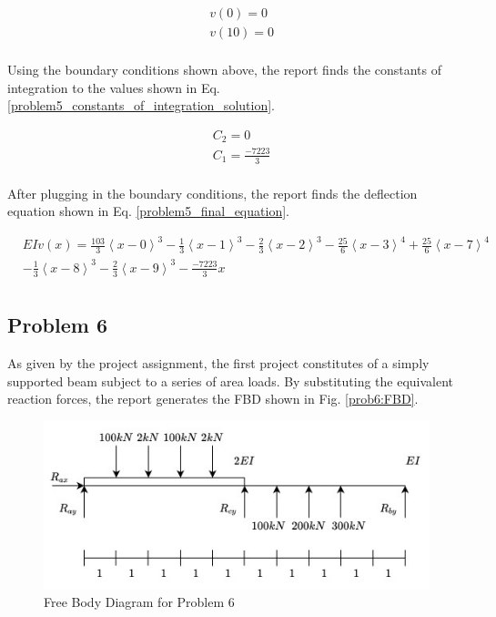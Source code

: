 \documentclass[a4paper]{article}
\begin{document}
\begin{equation}
\begin{split}
	& v(0) = 0 \\
	& v(10) = 0 \\
\end{split}
\label{problem5_constants_of_integration}
\end{equation}

Using the boundary conditions shown above, the report finds the constants of integration to the values shown in Eq. \ref{problem5_constants_of_integration_solution}.

\begin{equation}
\begin{split}
	& C_2 = 0 \\
	& C_1 = \frac{-7223}{3} \\
\end{split}
\label{problem5_constants_of_integration_solution}
\end{equation}

After plugging in the boundary conditions, the report finds the deflection equation shown in Eq. \ref{problem5_final_equation}.

\begin{equation}
\begin{split}
  & EI v(x) = \frac{103}{3}\left<x-0\right>^3 - \frac{1}{3}\left<x-1\right>^3 -  \frac{2}{3}\left<x-2\right>^3 - \frac{25}{6}\left<x-3\right>^4 + \frac{25}{6}\left<x-7\right>^4 \\
& - \frac{1}{3}\left<x-8\right>^3 -  \frac{2}{3}\left<x-9\right>^3 - \frac{-7223}{3}x\\
\end{split}
\label{problem5_final_equation}
\end{equation}



\subsection{Problem 6}

As given by the project assignment, the first project constitutes of a simply supported beam subject to a series of area loads. By substituting the equivalent reaction forces, the report generates the FBD shown in Fig. \ref{prob6:FBD}.

\begin{figure}[h]
\includegraphics[width=\textwidth]{FBD/FBD_6.jpg}
\caption{Free Body Diagram for Problem 6}
\label{FBD_6}
\end{figure}
\end{document}
